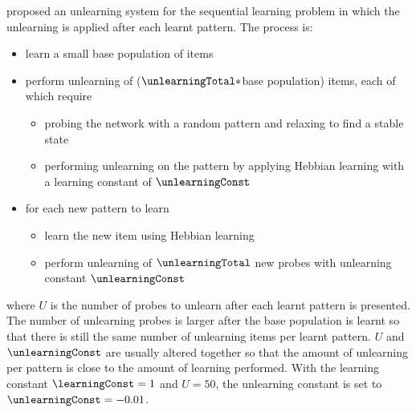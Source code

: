 \citet{Christos96} proposed an unlearning system for the sequential learning problem in which the unlearning is applied after each learnt pattern.  The process is:
\begin{itemize}[topsep=1ex, leftmargin=1cm, labelsep=0.2cm, itemindent=0pt,label=\textbullet]
	\item learn a small base population of items
	\item perform unlearning of ($\unlearningTotal*$base population) items, each of which require
	\begin{itemize}[topsep=1ex, leftmargin=1cm, labelsep=0.2cm, itemindent=0pt,label=\textbullet]
		\item probing the network with a random pattern and relaxing to find a stable state
		\item performing unlearning on the pattern by applying Hebbian learning with a learning constant of $\unlearningConst$
	\end{itemize}
	\item for each new pattern to learn
	\begin{itemize}[topsep=1ex, leftmargin=1cm, labelsep=0.2cm, itemindent=0pt,label=\textbullet]
		\item learn the new item using Hebbian learning
		\item perform unlearning of $\unlearningTotal$ new probes with unlearning constant $\unlearningConst$
	\end{itemize}
\end{itemize}
where $U$ is the number of probes to unlearn after each learnt pattern is presented.  The number of unlearning probes is larger after the base population is learnt so that there is still the same number of unlearning items per learnt pattern. $U$ and $\unlearningConst$ are usually altered together so that the amount of unlearning per pattern is close to the amount of learning performed.  With the learning constant $\learningConst =1$ and $U=50$, the unlearning constant is set to $\unlearningConst = -0.01$.

